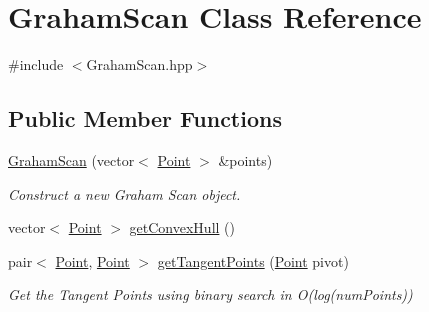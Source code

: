 \hypertarget{classGrahamScan}{}\section{Graham\+Scan Class Reference}
\label{classGrahamScan}


{\ttfamily \#include $<$Graham\+Scan.\+hpp$>$}

\subsection*{Public Member Functions}
\begin{DoxyCompactItemize}
\item 
\mbox{\hyperlink{classGrahamScan_aa774467ce21242d7ef7ffbd1680a6d61}{Graham\+Scan}} (vector$<$ \mbox{\hyperlink{classPoint}{Point}} $>$ \&points)
\begin{DoxyCompactList}\small\item\em Construct a new Graham Scan object. \end{DoxyCompactList}\item 
vector$<$ \mbox{\hyperlink{classPoint}{Point}} $>$ \mbox{\hyperlink{classGrahamScan_a374db012cb6a96fcb8530d07cddd498e}{get\+Convex\+Hull}} ()
\item 
pair$<$ \mbox{\hyperlink{classPoint}{Point}}, \mbox{\hyperlink{classPoint}{Point}} $>$ \mbox{\hyperlink{classGrahamScan_ae308d2013337902df55fa4feae2aec60}{get\+Tangent\+Points}} (\mbox{\hyperlink{classPoint}{Point}} pivot)
\begin{DoxyCompactList}\small\item\em Get the Tangent Points using binary search in O(log(num\+Points)) \end{DoxyCompactList}\end{DoxyCompactItemize}
